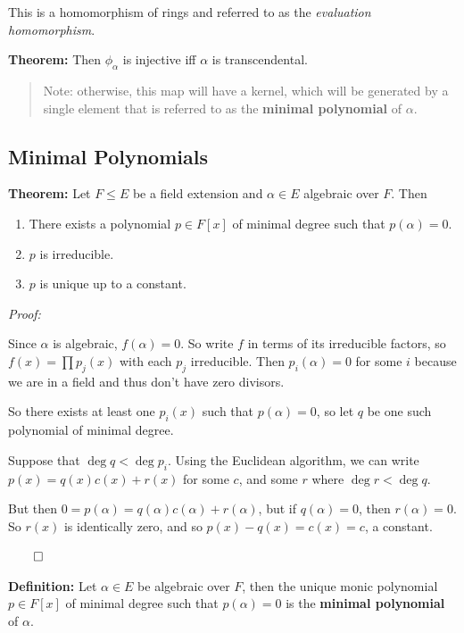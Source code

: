 This is a homomorphism of rings and referred to as the \emph{evaluation
homomorphism}.

\textbf{Theorem:} Then \(\phi_\alpha\) is injective iff \(\alpha\) is
transcendental.

\begin{quote}
Note: otherwise, this map will have a kernel, which will be generated by
a single element that is referred to as the \textbf{minimal polynomial}
of \(\alpha\).
\end{quote}

\hypertarget{minimal-polynomials}{%
\subsection{Minimal Polynomials}\label{minimal-polynomials}}

\textbf{Theorem:} Let \(F\leq E\) be a field extension and
\(\alpha \in E\) algebraic over \(F\). Then

\begin{enumerate}
\def\labelenumi{\arabic{enumi}.}
\item
  There exists a polynomial \(p\in F[x]\) of minimal degree such that
  \(p(\alpha) = 0\).
\item
  \(p\) is irreducible.
\item
  \(p\) is unique up to a constant.
\end{enumerate}

\emph{Proof:}

Since \(\alpha\) is algebraic, \(f(\alpha) = 0\). So write \(f\) in
terms of its irreducible factors, so \(f(x) = \prod p_j(x)\) with each
\(p_j\) irreducible. Then \(p_i(\alpha) = 0\) for some \(i\) because we
are in a field and thus don't have zero divisors.

So there exists at least one \(p_i(x)\) such that \(p(\alpha) = 0\), so
let \(q\) be one such polynomial of minimal degree.

Suppose that \(\deg q < \deg p_i\). Using the Euclidean algorithm, we
can write \(p(x) = q(x) c(x) + r(x)\) for some \(c\), and some \(r\)
where \(\deg r < \deg q\).

But then \(0 = p(\alpha) = q(\alpha)c(\alpha) + r(\alpha)\), but if
\(q(\alpha) = 0\), then \(r(\alpha) = 0\). So \(r(x)\) is identically
zero, and so \(p(x) - q(x) = c(x) = c\), a constant.

\(\qed\)

\textbf{Definition:} Let \(\alpha \in E\) be algebraic over \(F\), then
the unique monic polynomial \(p\in F[x]\) of minimal degree such that
\(p(\alpha) = 0\) is the \textbf{minimal polynomial} of \(\alpha\).

